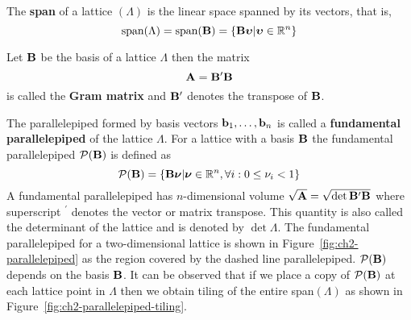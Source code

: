 The \textbf{span} of a lattice $(\Lambda)$ is the linear space spanned by its vectors, that is,
\[
\text{span}(\Lambda) = \text{span}(\mathbf{B}) = \{ \mathbf{B} \boldsymbol{\upsilon} | \boldsymbol{\upsilon} \in {\mathbb R}^n\}
\]

Let $\mathbf{B}$ be the basis of a lattice $\Lambda$ then the matrix
\[
\mathbf{A} = \mathbf{B}^\prime \mathbf{B}
\]
is called the \textbf{Gram matrix} and $\mathbf{B}^\prime$ denotes the transpose of $\mathbf{B}$.


The parallelepiped formed by basis vectors $\mathbf{b}_1,\dots,\mathbf{b}_n$ is called a \textbf{fundamental parallelepiped} of the lattice $\Lambda$. For a lattice with a basis $\mathbf{B}$ the fundamental parallelepiped $\mathcal{P}(\mathbf{B})$ is defined as
\[
\mathcal{P}(\mathbf{B}) = \{\mathbf{B} \boldsymbol{\nu} | \boldsymbol{\nu} \in {\mathbb R}^n, \forall i : 0 \leq \nu_i < 1 \}
\]
A fundamental parallelepiped has $n$-dimensional volume $\sqrt{\mathbf{A}} = \sqrt{\det \mathbf{B}^\prime\mathbf{B} }$ where superscript $^\prime$ denotes the vector or matrix transpose.  This quantity is also called the determinant of the lattice and is denoted by $\det\Lambda$.  The fundamental parallelepiped for a two-dimensional lattice is shown in Figure~\ref{fig:ch2-parallelepiped} as the region covered by the dashed line parallelepiped. $\mathcal{P}(\mathbf{B})$ depends on the basis $\mathbf{B}$. It can be observed that if we place a copy of $\mathcal{P}(\mathbf{B})$ at each lattice point in $\Lambda$ then we obtain tiling of the entire span$(\Lambda)$ as shown in Figure~\ref{fig:ch2-parallelepiped-tiling}.

